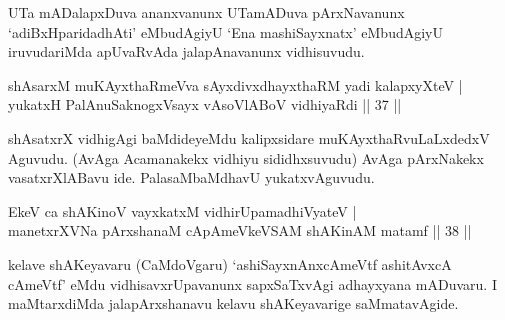 \begin{artha}
UTa mADalapxDuva ananxvanunx UTamADuva pArxNavanunx `adiBxHparidadhAti' eMbudAgiyU `Ena mashiSayxnatx' eMbudAgiyU iruvudariMda apUvaRvAda jalapAnavanunx vidhisuvudu.
\end{artha}

\begin{shl}
shAsarxM muKAyxthaRmeVva sAyxdivxdhayxthaRM yadi kalapxyXteV | \\
yukatxH PalAnuSaknogxV\s sayx vAsoVlABoV vidhiyaRdi \hfill|| 37 || 
\end{shl}

\begin{artha}
shAsatxrX vidhigAgi baMdideyeMdu kalipxsidare muKAyxthaRvuLaLxdedxV Aguvudu. (AvAga Acamanakekx vidhiyu sididhxsuvudu) AvAga pArxNakekx vasatxrXlABavu ide. PalasaMbaMdhavU yukatxvAguvudu.
\end{artha}

\begin{shl}
EkeV ca shAKinoV vayxkatxM vidhirUpamadhiVyateV | \\
manetxrXVNa pArxshanaM cApAmeVkeVSAM shAKinAM matamf \hfill|| 38 || 
\end{shl}

\begin{artha}
kelave shAKeyavaru (CaMdoVgaru) `ashiSayxnAnxcAmeVtf ashitAvxcA cAmeVtf' eMdu vidhisavxrUpavanunx sapxSaTxvAgi adhayxyana mADuvaru. I maMtarxdiMda jalapArxshanavu kelavu shAKeyavarige saMmatavAgide.
\end{artha}

